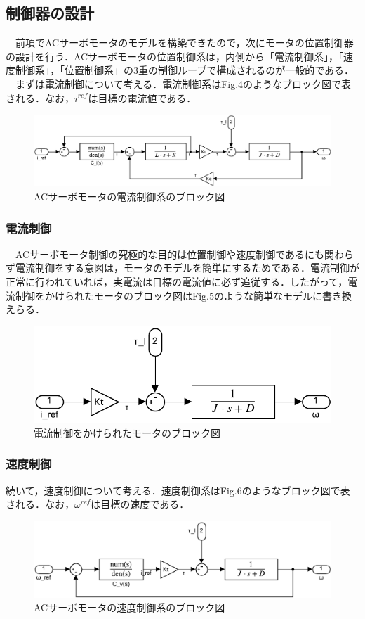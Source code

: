 \subsection{制御器の設計}
　前項でACサーボモータのモデルを構築できたので，次にモータの位置制御器の設計を行う．ACサーボモータの位置制御系は，内側から「電流制御系」，「速度制御系」，「位置制御系」の3重の制御ループで構成されるのが一般的である．\\
　まずは電流制御について考える．電流制御系はFig.4のようなブロック図で表される．なお，$i^{ref}$は目標の電流値である．
\begin{figure}[H]
    \centering
    \includegraphics[width=15cm]{./fig/fig4.pdf}
    \caption{ACサーボモータの電流制御系のブロック図}
\end{figure}

\subsubsection{電流制御}
　ACサーボモータ制御の究極的な目的は位置制御や速度制御であるにも関わらず電流制御をする意図は，モータのモデルを簡単にするためである．電流制御が正常に行われていれば，実電流は目標の電流値に必ず追従する．したがって，電流制御をかけられたモータのブロック図はFig.5のような簡単なモデルに書き換えらる．
\begin{figure}[H]
    \centering
    \includegraphics[]{./fig/fig5.pdf}
    \caption{電流制御をかけられたモータのブロック図}
\end{figure}

\subsubsection{速度制御}
続いて，速度制御について考える．速度制御系はFig.6のようなブロック図で表される．なお，$\omega^{ref}$は目標の速度である．
\begin{figure}[H]
    \centering
    \includegraphics[width=15cm]{./fig/fig6.pdf}
    \caption{ACサーボモータの速度制御系のブロック図}
\end{figure}

